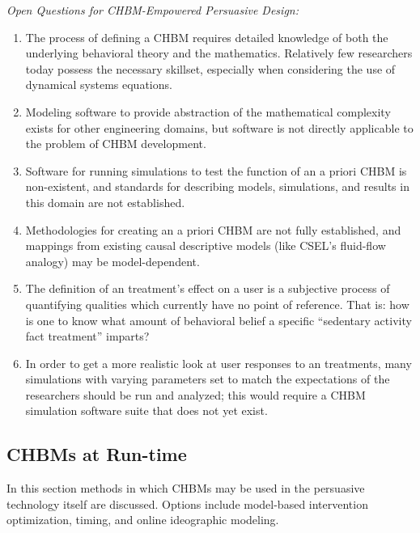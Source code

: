 \documentclass[runningheads,a4paper]{llncs}
\begin{document}
\emph{Open Questions for CHBM-Empowered Persuasive Design:}
\begin{enumerate}
    \item The process of defining a CHBM requires detailed knowledge of both the underlying behavioral theory and the mathematics. Relatively few researchers today possess the necessary skillset, especially when considering the use of dynamical systems equations.
    \item Modeling software to provide abstraction of the mathematical complexity exists for other engineering domains, but software is not directly applicable to the problem of CHBM development. %
    \item Software for running simulations to test the function of an a priori CHBM is non-existent, and standards for describing models, simulations, and results in this domain are not established.
    \item Methodologies for creating an a priori CHBM are not fully established, and mappings from existing causal descriptive models (like CSEL's fluid-flow analogy) may be model-dependent.
    \item The definition of an treatment's effect on a user is a subjective process of quantifying qualities which currently have no point of reference.
That is: how is one to know what amount of behavioral belief a specific ``sedentary activity fact treatment'' imparts?
  \item %
In order to get a more realistic look at user responses to an treatments, many simulations with varying parameters set to match the expectations of the researchers should be run and analyzed; this would require a CHBM simulation software suite that does not yet exist.
\end{enumerate}


\subsection{CHBMs at Run-time}
In this section methods in which CHBMs may be used in the persuasive technology itself are discussed. 
Options include model-based intervention optimization, timing, and online ideographic modeling.
\end{document}
